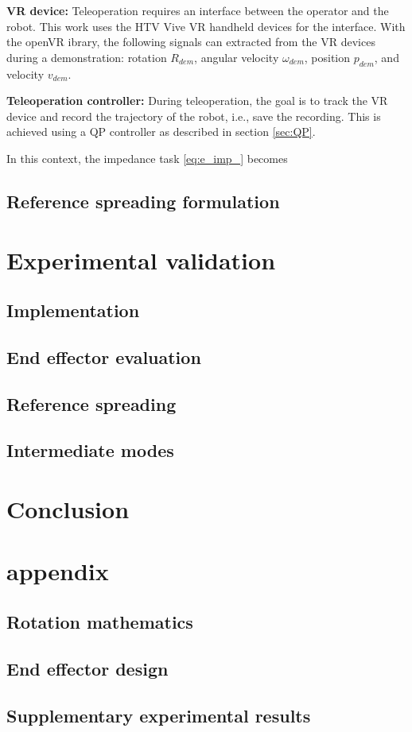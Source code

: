 \documentclass[a4paper, 10pt, conference]{ieeeconf}
\begin{document}
    \textbf{VR device:} Teleoperation requires an interface between the operator and the robot. This work uses the HTV Vive VR handheld devices for the interface. With the openVR ibrary, the following signals can extracted from the VR devices during a demonstration: rotation $R_{dem}$, angular velocity $\omega_{dem}$, position $p_{dem}$, and velocity $v_{dem}$.

    \textbf{Teleoperation controller:}
    During teleoperation, the goal is to track the VR device and record the trajectory of the robot, i.e., save the recording. This is achieved using a QP controller as described in section \ref{sec:QP}.

    In this context, the impedance task \eqref{eq:e_imp_} becomes 

    \subsection{Reference spreading formulation}

    \section{Experimental validation}
    \subsection{Implementation}
    \subsection{End effector evaluation}
    \subsection{Reference spreading}
    \subsection{Intermediate modes}

    \section{Conclusion}
    
\clearpage
\section*{appendix}
\subsection{Rotation mathematics}
\subsection{End effector design}
\subsection{Supplementary experimental results}
\end{document}
